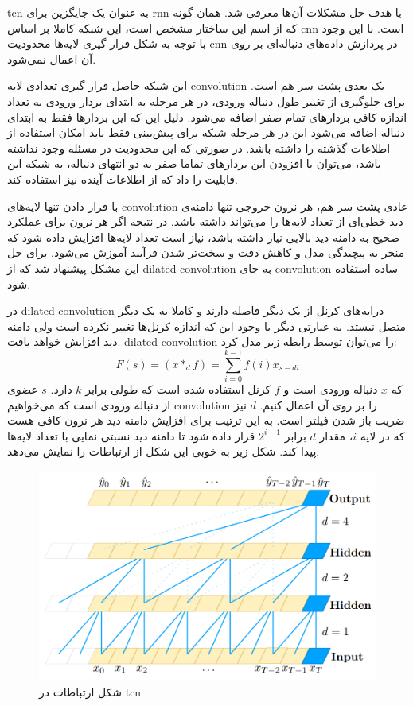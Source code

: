 \gls{tcn} به عنوان یک جایگزین برای \gls{rnn} با هدف حل مشکلات آن‌ها معرفی
شد\cite{bai2018empirical}. همان گونه که از اسم این ساختار مشخص است، این شبکه
کاملا بر اساس \gls{cnn} است. با این وجود با توجه به شکل قرار گیری لایه‌ها
محدودیت \gls{cnn} در پردازش داده‌های دنباله‌ای بر روی آن اعمال نمی‌شود.

این شبکه حاصل قرار گیری تعدادی لایه \gls{convolution} یک بعدی پشت سر هم است.
برای جلوگیری از تغییر طول دنباله ورودی، در هر مرحله به ابتدای بردار ورودی به
تعداد اندازه کافی بردارهای تمام صفر اضافه می‌شود. دلیل این که این بردارها فقط به
ابتدای دنباله اضافه می‌شود این در هر مرحله شبکه‌ برای پیش‌بینی فقط باید امکان
استفاده از اطلاعات گذشته را داشته باشد. در صورتی که این محدودیت در مسئله وجود
نداشته باشد، می‌توان با افزودن این بردار‌های تماما صفر به دو انتهای دنباله، به
شبکه این قابلیت را داد که از اطلاعات آینده نیز استفاده کند.

با قرار دادن تنها لایه‌های \gls{convolution} عادی پشت سر هم، هر نرون خروجی تنها
دامنه‌ی دید خطی‌ای از تعداد لایه‌ها را می‌تواند داشته باشد. در نتیجه اگر هر نرون
برای عملکرد صحیح به دامنه دید بالایی نیاز داشته باشد، نیاز است تعداد لایه‌ها
افزایش داده شود که منجر به پیچیدگی مدل و کاهش دقت و سخت‌تر شدن فرآیند آموزش
می‌شود. برای حل این مشکل پیشنهاد شد که از \gls{dilated convolution} به جای
\gls{convolution} ساده استفاده شود.

در \gls{dilated convolution} درایه‌های کرنل از یک دیگر فاصله دارند و کاملا به یک
دیگر متصل نیستد. به عبارتی دیگر با وجود این که اندازه کرنل‌ها تغییر نکرده است
ولی دامنه دید افزایش خواهد یافت. \gls{dilated convolution} را می‌توان توسط رابطه
زیر مدل کرد:
\begin{equation}
    F(s) = (x *_d f) = \sum_{i=0}^{k-1} f(i) x_{s-di}
\end{equation}
که $x$ دنباله ورودی است و $f$ کرنل استفاده شده است که طولی برابر $k$ دارد. $s$
عضوی از دنباله ورودی است که می‌خواهیم \gls{convolution} را بر روی آن اعمال کنیم.
$d$ نیز ضریب باز شدن فیلتر است. به این ترتیب برای افزایش دامنه دید هر نرون کافی
هست که در لایه $i$، مقدار $d$  برابر $2^{i-1}$ قرار داده شود تا دامنه دید نسبتی
نمایی با تعداد لایه‌ها پیدا کند. شکل زیر به خوبی این شکل از ارتباطات را نمایش
می‌دهد.
\begin{figure}[ht]
    \centering
    \includegraphics[height=7cm]{./statics/tcn_connections.png}
    \caption{شکل ارتباطات در \gls{tcn}}
\end{figure}

